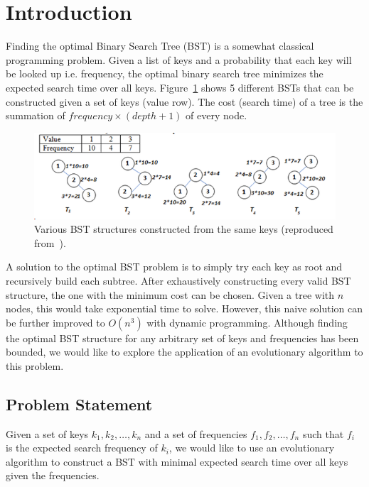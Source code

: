 
\section{Introduction}

Finding the optimal Binary Search Tree (BST) is a somewhat classical programming problem. Given a list of keys and a probability that each key will be looked up i.e. frequency, the optimal binary search tree minimizes the expected search time over all keys. Figure~\ref{fig:opt-bst} shows 5 different BSTs that can be constructed given a set of keys (value row). The cost (search time) of a tree is the summation of $frequency \times (depth + 1)$ of every node.

\begin{figure}[h]
    \centering
    \includegraphics[width=0.8\columnwidth]{figures/opt_bst.png}
    \caption{ \small Various BST structures constructed from the same keys (reproduced from~\cite{bst_figure}).}
    \label{fig:opt-bst}
\end{figure}

A solution to the optimal BST problem is to simply try each key as root and recursively build each subtree. After exhaustively constructing every valid BST structure, the one with the minimum cost can be chosen. Given a tree with $n$ nodes, this would take exponential time to solve. However, this naive solution can be further improved to $O(n^3)$ with dynamic programming. Although finding the optimal BST structure for any arbitrary set of keys and frequencies has been bounded, we would like to explore the application of an evolutionary algorithm to this problem.

\subsection{Problem Statement}

Given a set of keys $k_1,k_2,\dots,k_n$ and a set of frequencies $f_1,f_2,\dots,f_n$ such that $f_i$ is the expected search frequency of $k_i$, we would like to use an evolutionary algorithm to construct a BST with minimal expected search time over all keys given the frequencies.
